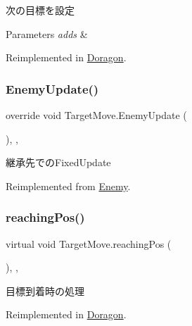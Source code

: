 次の目標を設定 


\begin{DoxyParams}{Parameters}
{\em adds} & \\
\hline
\end{DoxyParams}


Reimplemented in \hyperlink{class_doragon_a598414769bbb8243a523b937eba7225e}{Doragon}.

\mbox{\label{class_target_move_a4e86c888ec0ad3b43c30a6ff17a0411d}} 
\subsubsection{\texorpdfstring{Enemy\+Update()}{EnemyUpdate()}}
{\footnotesize\ttfamily override void Target\+Move.\+Enemy\+Update (\begin{DoxyParamCaption}{ }\end{DoxyParamCaption})\hspace{0.3cm}{\ttfamily [inline]}, {\ttfamily [protected]}, {\ttfamily [virtual]}}



継承先での\+Fixed\+Update 



Reimplemented from \hyperlink{class_enemy_ab19a73003a5b443ba93f4b6a45c0abad}{Enemy}.

\mbox{\label{class_target_move_aaac3d0086f68958d440f2131559894f2}} 
\subsubsection{\texorpdfstring{reaching\+Pos()}{reachingPos()}}
{\footnotesize\ttfamily virtual void Target\+Move.\+reaching\+Pos (\begin{DoxyParamCaption}{ }\end{DoxyParamCaption})\hspace{0.3cm}{\ttfamily [inline]}, {\ttfamily [protected]}, {\ttfamily [virtual]}}



目標到着時の処理 



Reimplemented in \hyperlink{class_doragon_a1fcb48ea850873c4b6d19cc3d215d2f5}{Doragon}.

